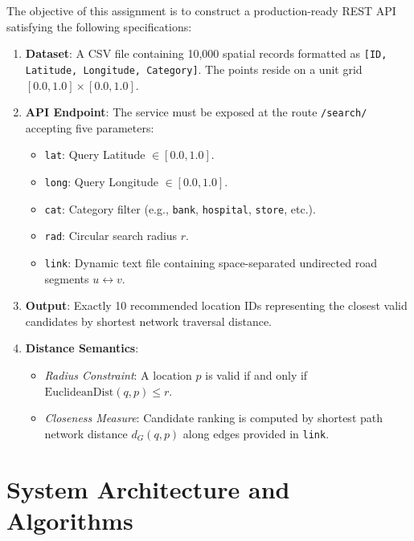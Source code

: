 \documentclass[11pt,a4paper]{article}
\begin{document}
The objective of this assignment is to construct a production-ready REST API satisfying the following specifications:
\begin{enumerate}
    \item \textbf{Dataset}: A CSV file containing 10,000 spatial records formatted as \texttt{[ID, Latitude, Longitude, Category]}. The points reside on a unit grid $[0.0, 1.0] \times [0.0, 1.0]$.
    \item \textbf{API Endpoint}: The service must be exposed at the route \texttt{/search/} accepting five parameters:
    \begin{itemize}
        \item \texttt{lat}: Query Latitude $\in [0.0, 1.0]$.
        \item \texttt{long}: Query Longitude $\in [0.0, 1.0]$.
        \item \texttt{cat}: Category filter (e.g., \texttt{bank}, \texttt{hospital}, \texttt{store}, etc.).
        \item \texttt{rad}: Circular search radius $r$.
        \item \texttt{link}: Dynamic text file containing space-separated undirected road segments $u \leftrightarrow v$.
    \end{itemize}
    \item \textbf{Output}: Exactly 10 recommended location IDs representing the closest valid candidates by shortest network traversal distance.
    \item \textbf{Distance Semantics}: 
    \begin{itemize}
        \item \emph{Radius Constraint}: A location $p$ is valid if and only if $\text{EuclideanDist}(q, p) \le r$.
        \item \emph{Closeness Measure}: Candidate ranking is computed by shortest path network distance $d_G(q, p)$ along edges provided in \texttt{link}.
    \end{itemize}
\end{enumerate}

\section{System Architecture and Algorithms}
\end{document}
